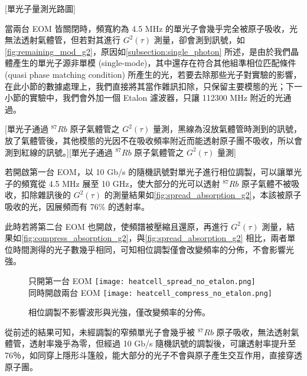 \documentclass[class=NCU_thesis, crop=false]{standalone}
\begin{document}
[單光子量測光路圖]

當兩台 EOM 皆關閉時，頻寬約為 4.5 MHz 的單光子會幾乎完全被原子吸收，光無法透射氣體管，但若對其進行 $G^{2}(\tau)$ 測量，卻會測到訊號，如\cref{fig:remaining_mod_g2}，原因如\cref{subsection:single_photon} 所述，是由於我們晶體產生的單光子源非單模 (single-mode)，其中還存在符合其他組準相位匹配條件 (quasi phase matching condition) 所產生的光，若要去除那些光子對實驗的影響，在此小節的數據處理上，我們直接將其當作雜訊扣除，只保留主要模態的光；下一小節的實驗中，我們會外加一個 Etalon 濾波器，只讓 112300 MHz 附近的光通過。

[單光子通過 $^{87}Rb$ 原子氣體管之 $G^{2}(\tau)$ 量測，黑線為沒放氣體管時測到的訊號，放了氣體管後，其他模態的光因不在吸收頻率附近而能透射原子團不吸收，所以會測到紅線的訊號。][單光子通過 $^{87}Rb$ 原子氣體管之 $G^{2}(\tau)$ 量測]

若開啟第一台 EOM，以 10 Gb/s 的隨機訊號對單光子進行相位調製，可以讓單光子的頻寬從 4.5 MHz 展至 10 GHz，使大部分的光可以透射 $^{87}Rb$ 原子氣體不被吸收，扣除雜訊後的 $G^2(\tau)$ 的測量結果如\cref{fig:spread_absorption_g2}，本該被原子吸收的光，因展頻而有 76\% 的透射率。

此時若將第二台 EOM 也開啟，使頻譜被壓縮且還原，再進行 $G^2(\tau)$ 測量，結果如\cref{fig:compress_absorption_g2}，與\cref{fig:spread_absorption_g2} 相比，兩者單位時間測得的光子數幾乎相同，可知相位調製僅會改變頻率的分佈，不會影響光強。


\begin{figure}[!hbt]
    \centering
    \subcaptionbox
        {只開第一台 EOM
        \label{fig:spread_absorption_g2}}
        {\texttt{[image: heatcell\_spread\_no\_etalon.png]}}
    ~~~~
    \subcaptionbox
        {同時開啟兩台 EOM
        \label{fig:compress_absorption_g2}}
        {\texttt{[image: heatcell\_compress\_no\_etalon.png]}}
    \caption{相位調製不影響波形與光強，僅改變頻率的分佈。}
    \label{fig:spread_or_not}
\end{figure}

從前述的結果可知，未經調製的窄頻單光子會幾乎被 $^{87}Rb$ 原子吸收，無法透射氣體管，透射率幾乎為零，但經過 10 Gb/s 隨機訊號的調製後，可讓透射率提升至 76％，如同穿上隱形斗篷般，能大部分的光子不會與原子產生交互作用，直接穿透原子團。
\end{document}
